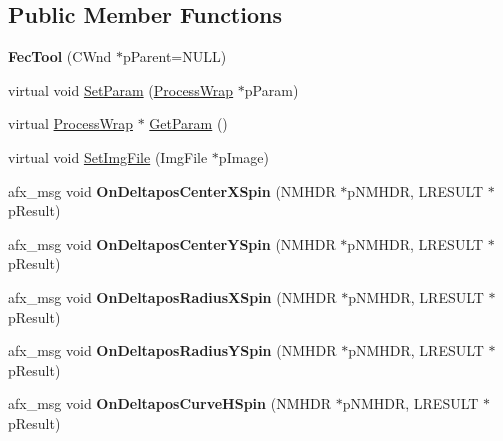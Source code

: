 \subsection*{Public Member Functions}
\begin{DoxyCompactItemize}
\item 
\mbox{\label{class_fec_tool_ad2b7046951f2aa7494e9b1a3f22bed02}} 
{\bfseries Fec\+Tool} (C\+Wnd $\ast$p\+Parent=N\+U\+LL)
\item 
virtual void \mbox{\hyperlink{class_fec_tool_acd6cd4230cb79fe0cb1053c588f91806}{Set\+Param}} (\mbox{\hyperlink{class_process_wrap}{Process\+Wrap}} $\ast$p\+Param)
\item 
virtual \mbox{\hyperlink{class_process_wrap}{Process\+Wrap}} $\ast$ \mbox{\hyperlink{class_fec_tool_acccda5a312354ec0dcd215de8ed7ac03}{Get\+Param}} ()
\item 
virtual void \mbox{\hyperlink{class_fec_tool_ac99805fa120b8bb7a21fc08382a875c1}{Set\+Img\+File}} (Img\+File $\ast$p\+Image)
\item 
\mbox{\label{class_fec_tool_a7a6d4107c9007878d2df2fb7da24942d}} 
afx\+\_\+msg void {\bfseries On\+Deltapos\+Center\+X\+Spin} (N\+M\+H\+DR $\ast$p\+N\+M\+H\+DR, L\+R\+E\+S\+U\+LT $\ast$p\+Result)
\item 
\mbox{\label{class_fec_tool_ac4a93c620e0c86c63f13c0ae8213d367}} 
afx\+\_\+msg void {\bfseries On\+Deltapos\+Center\+Y\+Spin} (N\+M\+H\+DR $\ast$p\+N\+M\+H\+DR, L\+R\+E\+S\+U\+LT $\ast$p\+Result)
\item 
\mbox{\label{class_fec_tool_adddbc3e62af06a502e71823b7e2d04ef}} 
afx\+\_\+msg void {\bfseries On\+Deltapos\+Radius\+X\+Spin} (N\+M\+H\+DR $\ast$p\+N\+M\+H\+DR, L\+R\+E\+S\+U\+LT $\ast$p\+Result)
\item 
\mbox{\label{class_fec_tool_acfe7023da87b248e66ba244817c7ff4f}} 
afx\+\_\+msg void {\bfseries On\+Deltapos\+Radius\+Y\+Spin} (N\+M\+H\+DR $\ast$p\+N\+M\+H\+DR, L\+R\+E\+S\+U\+LT $\ast$p\+Result)
\item 
\mbox{\label{class_fec_tool_a8f3294300b4ee2cbe52cac21b0d4dc43}} 
afx\+\_\+msg void {\bfseries On\+Deltapos\+Curve\+H\+Spin} (N\+M\+H\+DR $\ast$p\+N\+M\+H\+DR, L\+R\+E\+S\+U\+LT $\ast$p\+Result)
\item 

\end{DoxyCompactItemize}
